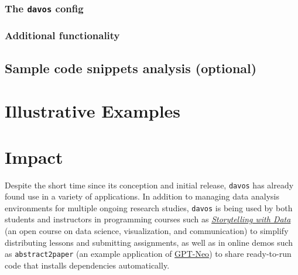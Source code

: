 \documentclass[preprint,12pt, a4paper]{elsarticle}
\begin{document}
\subsubsection{The \texttt{davos} config}

\subsubsection{Additional functionality}



\subsection{Sample code snippets analysis (optional)}


\section{Illustrative Examples}



\section{Impact}

Despite the short time since its conception and initial release, \texttt{davos} has already found use in a variety of applications.
In addition to managing data analysis environments for multiple ongoing research studies, \texttt{davos} is being used by both students and instructors in programming courses such as \href{https://github.com/ContextLab/storytelling-with-data}{\textit{Storytelling with Data}} \cite{Mann21b} (an open course on data science, visualization, and communication) to simplify distributing lessons and submitting assignments, as well as in online demos such as {\texttt{abstract2paper}} \cite{Mann21a} (an example application of \href{https://github.com/EleutherAI/gpt-neo}{GPT-Neo}) to share ready-to-run code that installs dependencies automatically.
\end{document}
